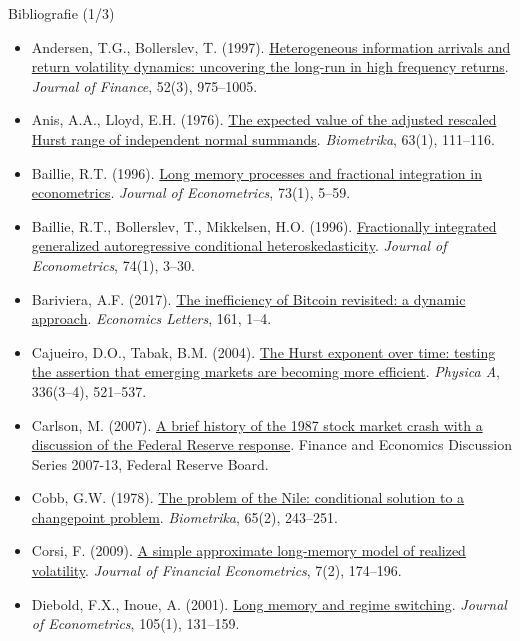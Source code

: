 \begin{frame}{Bibliografie (1/3)}
\itemsize{\tiny}
\begin{itemize}
    \item Andersen, T.G., Bollerslev, T. (1997). \href{https://doi.org/10.1111/j.1540-6261.1997.tb02722.x}{Heterogeneous information arrivals and return volatility dynamics: uncovering the long-run in high frequency returns}. \textit{Journal of Finance}, 52(3), 975--1005.
    \item Anis, A.A., Lloyd, E.H. (1976). \href{https://doi.org/10.1093/biomet/63.1.111}{The expected value of the adjusted rescaled Hurst range of independent normal summands}. \textit{Biometrika}, 63(1), 111--116.
    \item Baillie, R.T. (1996). \href{https://doi.org/10.1016/0304-4076(95)01732-1}{Long memory processes and fractional integration in econometrics}. \textit{Journal of Econometrics}, 73(1), 5--59.
    \item Baillie, R.T., Bollerslev, T., Mikkelsen, H.O. (1996). \href{https://doi.org/10.1016/S0304-4076(95)01749-6}{Fractionally integrated generalized autoregressive conditional heteroskedasticity}. \textit{Journal of Econometrics}, 74(1), 3--30.
    \item Bariviera, A.F. (2017). \href{https://doi.org/10.1016/j.econlet.2017.09.013}{The inefficiency of Bitcoin revisited: a dynamic approach}. \textit{Economics Letters}, 161, 1--4.
    \item Cajueiro, D.O., Tabak, B.M. (2004). \href{https://doi.org/10.1016/j.physa.2003.12.031}{The Hurst exponent over time: testing the assertion that emerging markets are becoming more efficient}. \textit{Physica A}, 336(3--4), 521--537.
    \item Carlson, M. (2007). \href{https://www.federalreserve.gov/pubs/feds/2007/200713/index.html}{A brief history of the 1987 stock market crash with a discussion of the Federal Reserve response}. Finance and Economics Discussion Series 2007-13, Federal Reserve Board.
    \item Cobb, G.W. (1978). \href{https://doi.org/10.1093/biomet/65.2.243}{The problem of the Nile: conditional solution to a changepoint problem}. \textit{Biometrika}, 65(2), 243--251.
    \item Corsi, F. (2009). \href{https://doi.org/10.1093/jjfinec/nbp001}{A simple approximate long-memory model of realized volatility}. \textit{Journal of Financial Econometrics}, 7(2), 174--196.
    \item Diebold, F.X., Inoue, A. (2001). \href{https://doi.org/10.1016/S0304-4076(01)00073-2}{Long memory and regime switching}. \textit{Journal of Econometrics}, 105(1), 131--159.

\end{itemize}
\end{frame}

